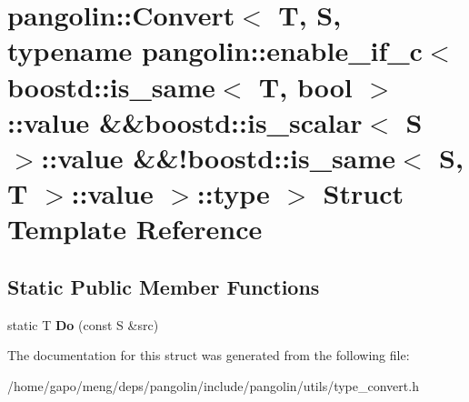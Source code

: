 \hypertarget{structpangolin_1_1_convert_3_01_t_00_01_s_00_01typename_01pangolin_1_1enable__if__c_3_01boostd_14fa16b198ae7b6f1e4cb0a8f7ff718eb}{}\section{pangolin\+:\+:Convert$<$ T, S, typename pangolin\+:\+:enable\+\_\+if\+\_\+c$<$ boostd\+:\+:is\+\_\+same$<$ T, bool $>$\+:\+:value \&\&boostd\+:\+:is\+\_\+scalar$<$ S $>$\+:\+:value \&\&!boostd\+:\+:is\+\_\+same$<$ S, T $>$\+:\+:value $>$\+:\+:type $>$ Struct Template Reference}
\label{structpangolin_1_1_convert_3_01_t_00_01_s_00_01typename_01pangolin_1_1enable__if__c_3_01boostd_14fa16b198ae7b6f1e4cb0a8f7ff718eb}
\subsection*{Static Public Member Functions}
\begin{DoxyCompactItemize}
\item 
static T {\bfseries Do} (const S \&src)\hypertarget{structpangolin_1_1_convert_3_01_t_00_01_s_00_01typename_01pangolin_1_1enable__if__c_3_01boostd_14fa16b198ae7b6f1e4cb0a8f7ff718eb_ab9dede8d154cb446b95e1edc8c2284a4}{}\label{structpangolin_1_1_convert_3_01_t_00_01_s_00_01typename_01pangolin_1_1enable__if__c_3_01boostd_14fa16b198ae7b6f1e4cb0a8f7ff718eb_ab9dede8d154cb446b95e1edc8c2284a4}

\end{DoxyCompactItemize}


The documentation for this struct was generated from the following file\+:\begin{DoxyCompactItemize}
\item 
/home/gapo/meng/deps/pangolin/include/pangolin/utils/type\+\_\+convert.\+h\end{DoxyCompactItemize}
